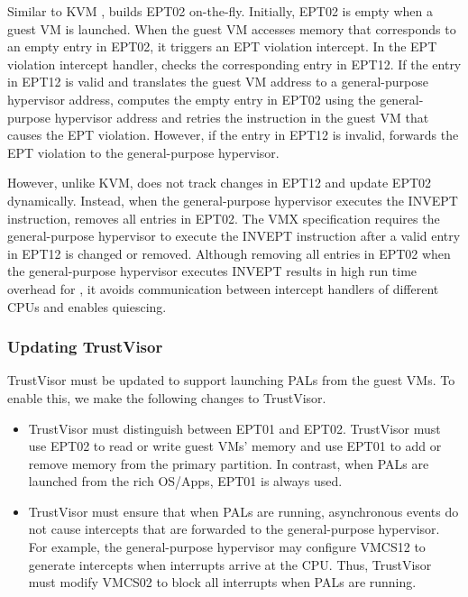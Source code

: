 Similar to KVM \cite{ben2010turtles},  builds EPT02 on-the-fly. Initially, EPT02 is empty when a guest VM is launched. When the guest VM accesses memory that corresponds to an empty entry in EPT02, it triggers an EPT violation intercept. In the EPT violation intercept handler,  checks the corresponding entry in EPT12. If the entry in EPT12 is valid and translates the guest VM address to a general-purpose hypervisor address,  computes the empty entry in EPT02 using the general-purpose hypervisor address and retries the instruction in the guest VM that causes the EPT violation. However, if the entry in EPT12 is invalid,  forwards the EPT violation to the general-purpose hypervisor.

However, unlike KVM,  does not track changes in EPT12 and update EPT02 dynamically. Instead, when the general-purpose hypervisor executes the INVEPT instruction,  removes all entries in EPT02. The VMX specification requires the general-purpose hypervisor to execute the INVEPT instruction after a valid entry in EPT12 is changed or removed. Although removing all entries in EPT02 when the general-purpose hypervisor executes INVEPT results in high run time overhead for , it avoids communication between intercept handlers of different CPUs and enables quiescing.

\subsubsection{Updating TrustVisor}

TrustVisor must be updated to support launching PALs from the guest VMs. To enable this, we make the following changes to TrustVisor.

\begin{itemize}
\item TrustVisor must distinguish between EPT01 and EPT02. TrustVisor must use EPT02 to read or write guest VMs' memory and use EPT01 to add or remove memory from the primary partition. In contrast, when PALs are launched from the rich OS/Apps, EPT01 is always used.

\item TrustVisor must ensure that when PALs are running, asynchronous events do not cause intercepts that are forwarded to the general-purpose hypervisor. For example, the general-purpose hypervisor may configure VMCS12 to generate intercepts when interrupts arrive at the CPU. Thus, TrustVisor must modify VMCS02 to block all interrupts when PALs are running.
\end{itemize}

